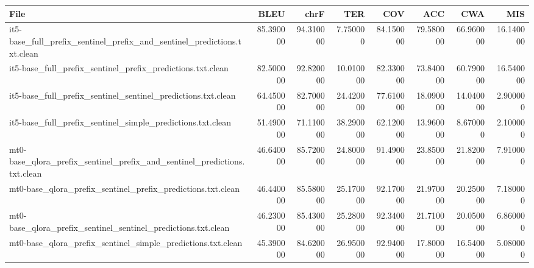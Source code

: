 \begin{tabular}{lrrrrrrr}
\toprule
File & BLEU & chrF & TER & COV & ACC & CWA & MIS \\
\midrule
it5-base_full_prefix_sentinel_prefix_and_sentinel_predictions.txt.clean & 85.390000 & 94.310000 & 7.750000 & 84.150000 & 79.580000 & 66.960000 & 16.140000 \\
it5-base_full_prefix_sentinel_prefix_predictions.txt.clean & 82.500000 & 92.820000 & 10.010000 & 82.330000 & 73.840000 & 60.790000 & 16.540000 \\
it5-base_full_prefix_sentinel_sentinel_predictions.txt.clean & 64.450000 & 82.700000 & 24.420000 & 77.610000 & 18.090000 & 14.040000 & 2.900000 \\
it5-base_full_prefix_sentinel_simple_predictions.txt.clean & 51.490000 & 71.110000 & 38.290000 & 62.120000 & 13.960000 & 8.670000 & 2.100000 \\
mt0-base_qlora_prefix_sentinel_prefix_and_sentinel_predictions.txt.clean & 46.640000 & 85.720000 & 24.800000 & 91.490000 & 23.850000 & 21.820000 & 7.910000 \\
mt0-base_qlora_prefix_sentinel_prefix_predictions.txt.clean & 46.440000 & 85.580000 & 25.170000 & 92.170000 & 21.970000 & 20.250000 & 7.180000 \\
mt0-base_qlora_prefix_sentinel_sentinel_predictions.txt.clean & 46.230000 & 85.430000 & 25.280000 & 92.340000 & 21.710000 & 20.050000 & 6.860000 \\
mt0-base_qlora_prefix_sentinel_simple_predictions.txt.clean & 45.390000 & 84.620000 & 26.950000 & 92.940000 & 17.800000 & 16.540000 & 5.080000 \\
\bottomrule
\end{tabular}
